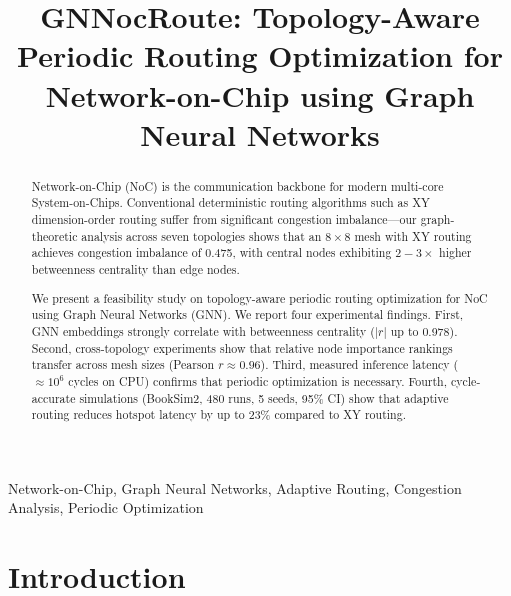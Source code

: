 \documentclass[conference]{IEEEtran}
\begin{document}
\title{GNNocRoute: Topology-Aware Periodic Routing Optimization for Network-on-Chip using Graph Neural Networks}

\author{
}

\maketitle

\begin{abstract}
Network-on-Chip (NoC) is the communication backbone for modern multi-core System-on-Chips. Conventional deterministic routing algorithms such as XY dimension-order routing suffer from significant congestion imbalance---our graph-theoretic analysis across seven topologies shows that an $8\times8$ mesh with XY routing achieves congestion imbalance of 0.475, with central nodes exhibiting $2-3\times$ higher betweenness centrality than edge nodes.

We present a feasibility study on topology-aware periodic routing optimization for NoC using Graph Neural Networks (GNN). We report four experimental findings. First, GNN embeddings strongly correlate with betweenness centrality ($|r|$ up to 0.978). Second, cross-topology experiments show that relative node importance rankings transfer across mesh sizes (Pearson $r \approx 0.96$). Third, measured inference latency ($\approx 10^6$ cycles on CPU) confirms that periodic optimization is necessary. Fourth, cycle-accurate simulations (BookSim2, 480 runs, 5 seeds, 95\% CI) show that adaptive routing reduces hotspot latency by up to 23\% compared to XY routing.
\end{abstract}

\begin{IEEEkeywords}
Network-on-Chip, Graph Neural Networks, Adaptive Routing, Congestion Analysis, Periodic Optimization
\end{IEEEkeywords}

\section{Introduction}
\label{sec:intro}
\end{document}
